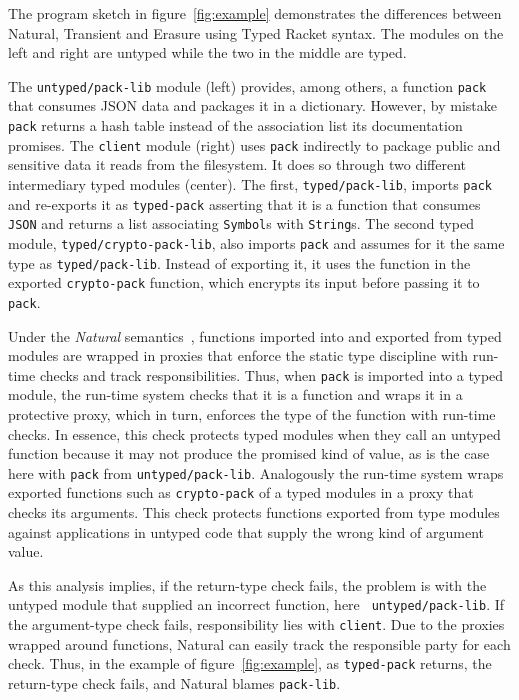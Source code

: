 
The program sketch in figure~\ref{fig:example} demonstrates the
differences between Natural, Transient and Erasure using Typed Racket
syntax.  The modules on the left and right are untyped while the two
in the middle are typed.

The \texttt{untyped/pack-lib} module (left) provides, among others, a function
\texttt{pack} that consumes JSON data and packages it in a dictionary. However,
by mistake \texttt{pack} returns a hash table instead of the association list
its documentation promises.  The \texttt{client} module (right) uses
\texttt{pack} indirectly to package public and sensitive data it reads from the
filesystem. It does so through two different intermediary typed modules
(center). The first, {\tt typed/pack-lib}, imports \texttt{pack} and re-exports
it as \texttt{typed-pack} asserting that it is a function that consumes {\tt
JSON} and returns a list associating {\tt Symbol}s with {\tt String}s. The
second typed module, {\tt typed/crypto-pack-lib}, also imports \texttt{pack} and
assumes for it the same type as {\tt typed/pack-lib}. Instead of exporting it,
it uses the function in the exported {\tt crypto-pack} function, which encrypts
its input before passing it to \texttt{pack}.

Under the {\it Natural\/} semantics~\cite{tf-popl-2008,tfffgksst-snapl-2017},
functions imported into and exported from typed modules are wrapped in proxies
that enforce the static type discipline with run-time checks and track
responsibilities. Thus, when \texttt{pack} is imported into a typed module, the
run-time system checks that it is a function and wraps it in a protective proxy,
which in turn, enforces the type of the function with run-time checks.  In
essence, this check protects typed modules when they call an untyped function
because it may not produce the promised kind of value, as is the case here with
{\tt pack} from {\tt untyped/pack-lib}. Analogously the run-time system wraps
exported functions such as {\tt crypto-pack} of a typed modules in a proxy that
checks its arguments.  This check protects functions exported from type modules
against applications in untyped code that supply the wrong kind of argument
value.

As this analysis implies, if the return-type check fails, the problem is with
the untyped module that supplied an incorrect function, here {\tt
untyped/pack-lib}. If the argument-type check fails, responsibility lies with
{\tt client}. Due to the proxies wrapped around functions, Natural can easily
track the responsible party for each check. Thus, in the example of
figure~\ref{fig:example}, as \texttt{typed-pack} returns, the return-type check
fails, and Natural blames \texttt{pack-lib}.

